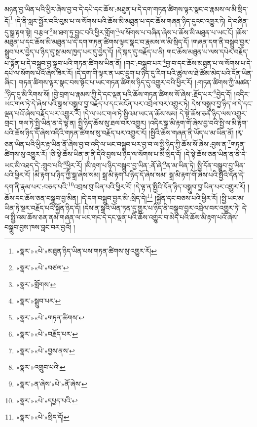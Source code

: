 མཉན་བྱ་ཡིན་པའི་ཕྱིར་ཞེས་བྱ་བ་དེ་དཔེ་དང་ཆོས་:མཐུན་པ་དེ་དག་གཏན་ཚིགས་ལྟར་སྣང་བ་རྣམས་ལ་མི་སྲིད་དོ།\footnote{«སྣར་»«པེ་»མཐུན་ཉིད་ཡིན་པས་གཏན་ཚིགས་སུ་འགྱུར་རོ།} །དེ་ནི་སླར་སྦྱོར་བའི་བུམ་པ་ལ་སོགས་པའི་ཆོས་མི་མཐུན་པ་དང་ཆོས་གཞན་ཉིད་དུའང་འགྱུར་ཏེ། དེ་བཞིན་དུ་སྒྲ་རྟག་སྟེ། བརྩལ་\footnote{«སྣར་»«པེ་»བཙལ་}མ་ཐག་ཏུ་བྱུང་བའི་ཕྱིར་གློག་\footnote{«སྣར་»གློགས་}ལ་སོགས་པ་བཞིན་ཞེས་པ་ཆོས་མི་མཐུན་པ་ཡང་ངོ། །ཆོས་མཐུན་པ་དང་ཆོས་མི་མཐུན་པ་དེ་དག་གཏན་ཚིགས་ལྟར་སྣང་བ་རྣམས་ལ་མི་སྲིད་དོ། །གཞན་དག་ནི་བསྒྲུབ་བྱར་སྒྲུབ་པར་བྱེད་པ་ཉིད་དུ་སྔ་མས་ཁྱད་པར་དུ་བྱེད་དོ། །དེ་སྐད་དུ་བརྗོད་པ་ནི། གང་ཆོས་མཐུན་པ་ལས་དཔེར་བརྗོད་པ་སྟོན་པ་དེ་བསྒྲུབ་བྱ་སྒྲུབ་པའི་གཏན་ཚིགས་ཡིན་ནོ། །གང་:བསྒྲུབ་པར་\footnote{«སྣར་»སྒྲུབ་པར་}བྱ་བ་དང་ཆོས་མཐུན་པ་ལ་སོགས་པ་དེ་དཔེ་ལ་སོགས་པའོ་ཞེས་ཟེར་རོ། །དེ་དག་གི་ལྟར་ན་ཡང་དྲུག་པ་ཉིད་དུ་རིག་པའི་ཚུལ་ལ་ཐེ་ཚོམ་མེད་པའི་དོན་ཡིན་ཞིང་། གཏན་ཚིགས་ལྟར་སྣང་བས་སྟོང་པ་ཡང་གཏན་ཚིགས་ཉིད་དུ་འགྱུར་བའི་ཕྱིར་རོ། །:གཏན་ཚིགས་ཀྱི་མཚན་\footnote{«སྣར་»«པེ་»གཏན་ཚིགས་}ཉིད་དུ་མི་རིགས་སོ། །བྱེ་བྲག་པ་རྣམས་ཀྱི་དེ་དང་ལྡན་པའི་ཆོས་གཏན་ཚིགས་སོ་ཞེས་:རྗོད་པར་\footnote{«སྣར་»«པེ་»བརྗོད་པར་}བྱེད་དོ། །འདིར་ཡང་གལ་ཏེ་དེ་ཞེས་པའི་སྒྲས་བསྒྲུབ་བྱ་བརྗོད་པ་དང་མངོན་པར་འབྲེལ་བར་འགྱུར་ཏེ། དེས་བསྒྲུབ་བྱ་ཉིད་ལ་དེ་དང་ལྡན་པའོ་ཞེས་བརྗོད་པར་འགྱུར་རོ། །དེ་ལ་ཡང་གལ་ཏེ་སྤྱིའམ་ཡང་ན་ཆོས་སམ། དེ་སྟེ་ཆོས་ཅན་ཉིད་ལས་འགྱུར་གྲང་། གལ་ཏེ་སྤྱི་ཡིན་ན་དེ་ལྟ་ན། སྤྱི་ཉིད་ཆོས་སུ་ཐལ་བར་འགྱུར། །འདིར་སྒྲ་མི་རྟག་གོ་ཞེས་བྱ་བའི་སྤྱི་ལ་མི་རྟག་པའི་ཆོས་ཉིད་དོ་ཞེས་འདིའི་གཏན་ཚིགས་སུ་བརྗོད་པར་འགྱུར་རོ། །སྤྱིའི་ཆོས་གཞན་ནི་ཡོད་པ་མ་ཡིན་ནོ། །རྭ་ཅན་ཡིན་པའི་ཕྱིར་རྟ་ཡིན་ནོ་ཞེས་བྱ་བ་འདི་ལ་ཡང་བསྒྲུབ་པར་བྱ་བ་ལ་སྤྱི་ཉིད་ཀྱི་ཆོས་སོ་ཞེས་:བྱས་ན་\footnote{«སྣར་»«པེ་»བྱས་ནས་}གཏན་ཚིགས་སུ་འགྱུར་རོ། །ཅི་སྟེ་ཆོས་ཡིན་ན་ནི་དེའི་བྱས་པ་ཉིད་ལ་སོགས་པ་མི་སྲིད་དོ། །དེ་སྟེ་ཆོས་ཅན་ཡིན་ན་ནི་དེ་ཡང་མི་འཐད་དེ་:གྲུབ་པའི་\footnote{«སྣར་»འགྲུབ་པའི་}ཕྱིར་རོ། །མི་རྟག་པ་ཉིད་བསྒྲུབ་བྱ་ཡིན་:ནོ་ཞེ་\footnote{«སྣར་»ན་ཞེས་«པེ་»ནོ་ཞེས་}ན་མ་ཡིན་ཏེ། སྤྱི་དོན་བསྒྲུབ་བྱ་ཡིན་པའི་ཕྱིར་རོ། །མི་རྟག་པ་ཉིད་ཀྱི་སྒྲ་ཞེས་སམ། སྒྲ་མི་རྟག་པ་ཉིད་དོ་ཞེས་སམ། སྒྲ་མི་རྟག་གོ་ཞེས་པའི་སྤྱིའི་དོན་དེ་དག་ནི་རྣམ་པར་:བཅད་པའི་\footnote{«སྣར་»«པེ་»དཔྱད་པའི་}འབྲས་བུ་ཡིན་པའི་ཕྱིར་རོ། །དེ་ལྟ་ན་སྤྱིའི་དོན་ཉིད་བསྒྲུབ་བྱ་ཡིན་པར་འགྱུར་རོ། །ཆོས་དང་ཆོས་ཅན་བསྒྲུབ་བྱ་མིན། །དེ་དག་བསྒྲུབ་བྱར་མི་:སྲིད་དེ།\footnote{«སྣར་»«པེ་»སྲིད་དོ།} །སྐྱོན་དང་བཅས་པའི་ཕྱིར་རོ། །སྤྱི་ཡང་མ་ཡིན་ཏེ་སྔར་བརྗོད་པའི་སྐྱོན་ཉིད་དོ། །དེས་ན་སྒྲའི་ཡོན་ཏན་དུ་གྱུར་པ་ཉིད་ནི་བསྒྲུབ་བྱར་འབྲེལ་བར་འགྱུར་ཏེ། དེ་ལ་སྤྱི་འམ་ཆོས་ཅན་ནམ་གཞན་ལ་ཡང་གང་དེ་དང་ལྡན་པའི་ཆོས་འགྱུར་བ་མེད་པའི་ཆོས་མི་རྟག་པའོ་ཞེས་བསྒྲུབ་བྱས་ཁས་བླང་བར་བྱའོ། །
